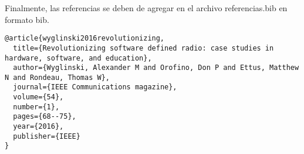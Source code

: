 \documentclass[12pt]{difu100cia} %
\begin{document}
Finalmente, las referencias se deben de agregar en el archivo referencias.bib en formato bib. 

\begin{lstlisting}
@article{wyglinski2016revolutionizing,
  title={Revolutionizing software defined radio: case studies in hardware, software, and education},
  author={Wyglinski, Alexander M and Orofino, Don P and Ettus, Matthew N and Rondeau, Thomas W},
  journal={IEEE Communications magazine},
  volume={54},
  number={1},
  pages={68--75},
  year={2016},
  publisher={IEEE}
}
\end{lstlisting}


\printbibliography

\end{document}
